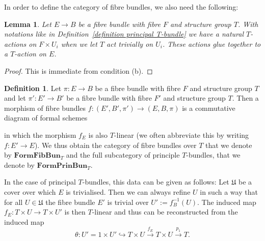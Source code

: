 \documentclass[11pt,oneside]{amsart}
\newtheorem{lemma}[theorem]{Lemma}
\theoremstyle{definition}
\newtheorem{definition}[theorem]{Definition}
\theoremstyle{remark}
\begin{document}
	In order to define the category of  fibre bundles, we also need the following:
	\begin{lemma}
		Let $E\rightarrow B$ be a fibre bundle with fibre $F$ and structure group $T$. With notations like in Definition~\ref{definition principal T-bundle} we have a natural $T$-actions on $F\times U_{i}$ when we let $T$ act trivially on $U_{i}$. These actions glue together to a $T$-action on $E$.
	\end{lemma}
	\begin{proof}
		This is immediate from condition (b).
	\end{proof}
	\begin{definition}
		Let $\pi:E\rightarrow B$ be a fibre bundle with fibre $F$ and structure group $T$ and let $\pi':E'\rightarrow B'$ be a fibre bundle with fibre $F'$ and structure group $T$. Then a morphism of fibre bundles $f:(E',B',\pi')\rightarrow (E,B,\pi)$ is a commutative diagram of formal schemes
		\begin{center}
		\end{center}
		in which the morphism $f_E$ is also $T$-linear (we often abbreviate this by writing $f:E'\rightarrow E$). We thus obtain the category of fibre bundles over $T$ that we denote by $\mathbf{FormFibBun}_T$ and the full subcategory of principle $T$-bundles, that we denote by $\mathbf{FormPrinBun}_T$.
	\end{definition}
	
	In the case of principal $T$-bundles, this data can be given as follows: Let $\mathfrak U$ be a cover over which $E$ is trivialised. Then we can always refine $U$ in such a way that for all $U\in \mathfrak{U}$ the fibre bundle $E'$ is trivial over $U':=f_B^{-1}(U)$. The induced map $f_E:T\times U\rightarrow T\times U'$ is then $T$-linear and thus can be reconstructed from the induced map
	\[\theta:U'=1\times U'\hookrightarrow T\times U\xrightarrow{f_E} T\times U\xrightarrow{p_1} T.\]
	
\end{document}
